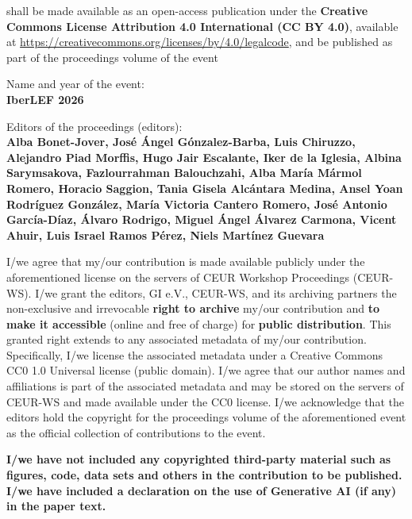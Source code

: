 \documentclass[a4paper,10pt]{article}
\begin{document}
\vspace{0.3cm}

\noindent
shall be made available as an open-access publication under the \textbf{Creative Commons License Attribution 4.0 International (CC BY 4.0)}, available at \url{https://creativecommons.org/licenses/by/4.0/legalcode}, and be published as part of the proceedings volume of the event

\vspace{0.2cm}
\noindent
Name and year of the event: \\
\textbf{IberLEF 2026}

\vspace{0.2cm}
\noindent
Editors of the proceedings (editors): \\
{\small \textbf{Alba Bonet-Jover, Jos\'e \'Angel G\'onzalez-Barba, Luis Chiruzzo, Alejandro Piad Morffis, Hugo Jair Escalante, Iker de la Iglesia, Albina Sarymsakova, Fazlourrahman Balouchzahi, Alba Mar\'ia M\'armol Romero, Horacio Saggion, Tania Gisela Alc\'antara Medina, Ansel Yoan Rodr\'iguez Gonz\'alez, Mar\'ia Victoria Cantero Romero, Jos\'e Antonio Garc\'ia-D\'iaz, \'Alvaro Rodrigo, Miguel \'Angel \'Alvarez Carmona, Vicent Ahuir, Luis Israel Ramos P\'erez, Niels Mart\'inez Guevara}}

\vspace{0.3cm}

\noindent
{\footnotesize I/we agree that my/our contribution is made available publicly under the aforementioned license on the servers of CEUR Workshop Proceedings (CEUR-WS). I/we grant the editors, GI e.V., CEUR-WS, and its archiving partners the non-exclusive and irrevocable \textbf{right to archive} my/our contribution and \textbf{to make it accessible} (online and free of charge) for \textbf{public distribution}. This granted right extends to any associated metadata of my/our contribution. Specifically, I/we license the associated metadata under a Creative Commons CC0 1.0 Universal license (public domain). I/we agree that our author names and affiliations is part of the associated metadata and may be stored on the servers of CEUR-WS and made available under the CC0 license. I/we acknowledge that the editors hold the copyright for the proceedings volume of the aforementioned event as the official collection of contributions to the event.\par}

\vspace{0.2cm}
\noindent
{\footnotesize \textbf{I/we have not included any copyrighted third-party material such as figures, code, data sets and others in the contribution to be published. I/we have included a declaration on the use of Generative AI (if any) in the paper text.}\par}
\end{document}
